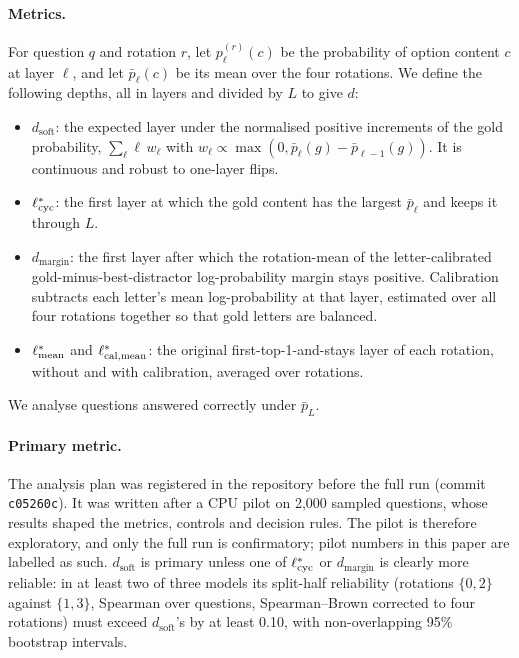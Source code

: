 \paragraph{Metrics.}
For question $q$ and rotation $r$, let $p^{(r)}_\ell(c)$ be the probability of option content $c$ at layer $\ell$, and let $\bar p_\ell(c)$ be its mean over the four rotations.
We define the following depths, all in layers and divided by $L$ to give $d$:
\begin{itemize}
\itemsep0em
\item $d_{\mathrm{soft}}$: the expected layer under the normalised positive increments of the gold probability, $\sum_\ell \ell\, w_\ell$ with $w_\ell \propto \max(0, \bar p_\ell(g) - \bar p_{\ell-1}(g))$. It is continuous and robust to one-layer flips.
\item $\ell^{*}_{\mathrm{cyc}}$: the first layer at which the gold content has the largest $\bar p_\ell$ and keeps it through $L$.
\item $d_{\mathrm{margin}}$: the first layer after which the rotation-mean of the letter-calibrated gold-minus-best-distractor log-probability margin stays positive. Calibration subtracts each letter's mean log-probability at that layer, estimated over all four rotations together so that gold letters are balanced.
\item $\ell^{*}_{\mathrm{mean}}$ and $\ell^{*}_{\mathrm{cal,mean}}$: the original first-top-1-and-stays layer of each rotation, without and with calibration, averaged over rotations.
\end{itemize}
We analyse questions answered correctly under $\bar p_L$.

\paragraph{Primary metric.}
\label{sec:prereg}
The analysis plan was registered in the repository before the full run (commit \texttt{c05260c}).
It was written after a CPU pilot on 2{,}000 sampled questions, whose results shaped the metrics, controls and decision rules.
The pilot is therefore exploratory, and only the full run is confirmatory; pilot numbers in this paper are labelled as such.
$d_{\mathrm{soft}}$ is primary unless one of $\ell^{*}_{\mathrm{cyc}}$ or $d_{\mathrm{margin}}$ is clearly more reliable: in at least two of three models its split-half reliability (rotations $\{0,2\}$ against $\{1,3\}$, Spearman over questions, Spearman--Brown corrected to four rotations) must exceed $d_{\mathrm{soft}}$'s by at least 0.10, with non-overlapping 95\% bootstrap intervals.

